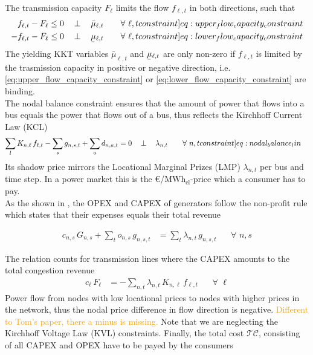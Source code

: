 \documentclass[11pt]{article}
\newcommand{\ubar}[1]{\underaccent{\bar}{#1}}
\newcommand{\note}[1]{\textcolor{Orange}{#1}}
\newcommand{\generation}{g_{n,s,t}}
\newcommand{\capacityGeneration}{G_{n,s}}
\newcommand{\capacityFlow}{F_{\ell}}
\newcommand{\capexGeneration}{c_{n,s}}
\newcommand{\capexFlow}{c_{\ell}}
\newcommand{\opexGeneration}[1][n]{o_{#1,s}}
\newcommand{\demand}[1][n]{d_{#1,a,t}}
\newcommand{\incidence}[1][n]{K_{#1,\ell}}
\newcommand{\mulowerflow}{\ubar{\mu}_{\ell,t}}
\newcommand{\muupperflow}{\bar{\mu}_{\ell,t}}
\newcommand{\lmp}[1][n]{\lambda_{#1,t}}
\newcommand{\flow}{f_{\ell,t}}
\newcommand{\megawatthour}{MWh$_\text{el}$}
\newcommand{\totalcost}{\mathcal{TC}}
\newcommand{\resultsin}[1]{\hspace{12pt} \bot  \hspace{12pt} #1}
\newcommand{\Forall}[1]{\hspace{20pt} \forall \,\, #1 }
\begin{document}
\noindent
The transmission capacity $\capacityFlow$ limits the flow $\flow$ in both directions, such that 
\begin{align}
 \flow - \capacityFlow &\le 0 \resultsin{\muupperflow} \Forall{\ell,t} 
 \label[constraint]{eq:upper_flow_capacity_constraint} \\
 - \flow - \capacityFlow &\le 0 \resultsin{\mulowerflow} \Forall{\ell,t} 
 \label[constraint]{eq:lower_flow_capacity_constraint}
\end{align}
The yielding KKT variables $\muupperflow$ and $\mulowerflow$ are only non-zero if $\flow$ is limited by the trasmission capacity in positive or negative direction, i.e. \cref{eq:upper_flow_capacity_constraint} or \cref{eq:lower_flow_capacity_constraint} are binding. \\

The nodal balance constraint ensures that the amount of power that flows into a bus equals the power that flows out of a bus, thus reflects the Kirchhoff Current Law (KCL)
\begin{align}
    \sum_l \incidence \, \flow - \sum_s \generation + \sum_a \demand &= 0 \resultsin{\lmp} \Forall{n,t}
    \label[constraint]{eq:nodal_balance_lin}
\end{align}
Its shadow price mirrors the Locational Marginal Prizes (LMP) $\lmp$ per bus and time step. In a power market this is the \euro/\megawatthour-price which a consumer has to pay. \\

As the shown in \cite{brown_decreasing_2020}, the OPEX and CAPEX of generators follow the non-profit rule which states that their expenses equals their total revenue 

\begin{align}
\capexGeneration \, \capacityGeneration + \sum_{t} \opexGeneration \, \generation &= \sum_{t} \lmp \, \generation \Forall{n,s}\label{eq:non_profit_generator}
\end{align}

\noindent
The relation counts for transmission lines where the CAPEX amounts to the total congestion revenue
\begin{align}
\capexFlow \, \capacityFlow &= - \sum_{n,t} \lmp \, \incidence \, \flow \Forall{\ell} \label{eq:non_profit_branch}
\end{align}
Power flow from nodes with low locational prices to nodes with higher prices in the network, thus the nodal price difference in flow direction is negative. \note{Different to Tom's paper, there a minus is missing.}
Note that we are neglecting the Kirchhoff Voltage Law (KVL) constraints. Finally, the total cost $\totalcost$, consisting of all CAPEX and OPEX have to be payed by the consumers 
\end{document}
